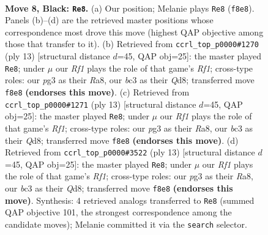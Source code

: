 \documentclass[11pt]{article}
\begin{document}
\begin{figure}[p]\centering
\begin{subfigure}{0.46\textwidth}\centering
\resizebox{\linewidth}{!}{%
\newchessgame
\chessboard[
  setfen={r1b2rk1/ppppqppp/2n1pn2/8/2PP3P/2B2NP1/PP2PP2/R2QKB1R b KQ - 0 8},
  showmover=false,
  pgfstyle=straightmove, color=movearrow, markmove={f8-e8}
]}
\caption{}
\end{subfigure}\hfill
\begin{subfigure}{0.46\textwidth}\centering
\resizebox{\linewidth}{!}{%
\newchessgame
\chessboard[
  setfen={r1bq1rk1/pppp1ppp/2n2n2/4p3/2P5/2P2NP1/P2PPPBP/R1BQ1RK1 b - - 0 7},
  showmover=false,
  pgfstyle=straightmove, color=movearrow, markmove={f8-e8}
]}
\caption{}
\end{subfigure}
\\[4pt]
\begin{subfigure}{0.46\textwidth}\centering
\resizebox{\linewidth}{!}{%
\newchessgame
\chessboard[
  setfen={r1bq1rk1/pppp1ppp/2n2n2/4p3/2P5/2P2NP1/P2PPPBP/R1BQ1RK1 b - - 0 7},
  showmover=false,
  pgfstyle=straightmove, color=movearrow, markmove={f8-e8}
]}
\caption{}
\end{subfigure}\hfill
\begin{subfigure}{0.46\textwidth}\centering
\resizebox{\linewidth}{!}{%
\newchessgame
\chessboard[
  setfen={r1bq1rk1/pppp1ppp/2n2n2/4p3/2P5/2P2NP1/P2PPPBP/R1BQ1RK1 b - - 0 7},
  showmover=false,
  pgfstyle=straightmove, color=movearrow, markmove={f8-e8}
]}
\caption{}
\end{subfigure}
\caption{\textbf{Move 8, Black: \texttt{Re8}.} (a) Our position; Melanie plays \texttt{Re8} (\texttt{f8e8}). Panels (b)--(d) are the retrieved master positions whose correspondence most drove this move (highest QAP objective among those that transfer to it). (b) Retrieved from \texttt{ccrl\_top\_p0000\#1270} (ply 13) [structural distance $d$=45, QAP obj=25]: the master played \texttt{Re8}; under $\mu$ our \emph{Rf1} plays the role of that game's \emph{Rf1}; cross-type roles: our \emph{p}g3 as their \emph{R}a8, our \emph{b}c3 as their \emph{Q}d8; transferred move \texttt{f8e8} \textbf{(endorses this move)}. (c) Retrieved from \texttt{ccrl\_top\_p0000\#1271} (ply 13) [structural distance $d$=45, QAP obj=25]: the master played \texttt{Re8}; under $\mu$ our \emph{Rf1} plays the role of that game's \emph{Rf1}; cross-type roles: our \emph{p}g3 as their \emph{R}a8, our \emph{b}c3 as their \emph{Q}d8; transferred move \texttt{f8e8} \textbf{(endorses this move)}. (d) Retrieved from \texttt{ccrl\_top\_p0000\#3522} (ply 13) [structural distance $d$=45, QAP obj=25]: the master played \texttt{Re8}; under $\mu$ our \emph{Rf1} plays the role of that game's \emph{Rf1}; cross-type roles: our \emph{p}g3 as their \emph{R}a8, our \emph{b}c3 as their \emph{Q}d8; transferred move \texttt{f8e8} \textbf{(endorses this move)}. Synthesis: 4 retrieved analogs transferred to \texttt{Re8} (summed QAP objective 101, the strongest correspondence among the candidate moves); Melanie committed it via the \texttt{search} selector.}
\label{fig:thought-m15}
\end{figure}
\end{document}

